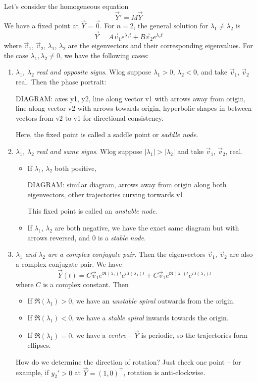 \documentclass{../../template/note}
\begin{document}
    Let's consider the homogeneous equation
    \[
        \vec Y' = M \vec Y
    \]
    We have a fixed point at \(\vec Y = \vec 0\). For \(n = 2\), the general solution for \(\lambda_1 \neq \lambda_2\) is
    \[
        \vec Y = A \vec v_1 e^{\lambda_1t} + B \vec v_2 e^{\lambda_2 t}
    \]
    where \(\vec v_1\), \(\vec v_2\), \(\lambda_1\), \(\lambda_2\) are the eigenvectors and their corresponding eigenvalues. For the case \(\lambda_1, \lambda_2 \neq 0\), we have the following cases:
    \begin{enumerate}[label=\protect\circled{\arabic*}]
        \item \emph{\(\lambda_1\), \(\lambda_2\) real and opposite signs}. Wlog suppose \(\lambda_1 > 0\), \(\lambda_2 < 0\), and take \(\vec v_1\), \(\vec v_2\) real. Then the phase portrait:

        DIAGRAM: axes y1, y2, line along vector v1 with arrows away from origin, line along vector v2 with arrows towards origin, hyperbolic shapes in between vectors from v2 to v1 for directional consistency.

        Here, the fixed point is called a saddle point or \emph{saddle node}.
        \item \emph{\(\lambda_1\), \(\lambda_2\) real and same signs}. Wlog suppose \(|\lambda_1|>|\lambda_2|\) and take \(\vec v_1\), \(\vec v_2\), real.
        \begin{itemize}
            \item If \(\lambda_1\), \(\lambda_2\) both positive,
            
            DIAGRAM: similar diagram, arrows away from origin along both eigenvectors, other trajectories curving torwards v1

            This fixed point is called an \emph{unstable node}.
            \item If \(\lambda_1\), \(\lambda_2\) are both negative, we have the exact same diagram but with arrows reversed, and 0 is a \emph{stable node}.
        \end{itemize}
        \item \emph{\(\lambda_1\) and \(\lambda_2\) are a complex conjugate pair}. Then the eigenvectors \(\vec v_1\), \(\vec v_2\) are also a complex conjugate pair. We have
        \[
            \vec Y(t) = C \vec v_1 e^{\Re(\lambda_1)t}e^{i\Im(\lambda_1)t} + \overline{C \vec v_1 e^{\Re(\lambda_1)t}e^{i\Im(\lambda_1)t}}
        \]
        where \(C\) is a complex constant. Then
        \begin{itemize}
            \item If \(\Re(\lambda_1) > 0\), we have an \emph{unstable spiral} outwards from the origin.
            \item If \(\Re(\lambda_1) < 0\), we have a \emph{stable spiral} inwards towards the origin.
            \item If \(\Re(\lambda_1) = 0\), we have a \emph{centre} -- \(\vec Y\) is periodic, so the trajectories form ellipses.
        \end{itemize}
        How do we determine the direction of rotation? Just check one point -- for example, if \(y_2' > 0\) at \(\vec Y = (1, 0)^\intercal\), rotation is anti-clockwise.
    \end{enumerate}
\end{document}
